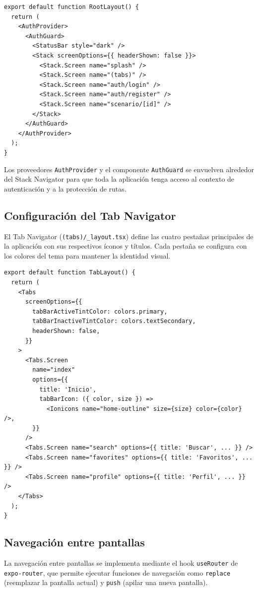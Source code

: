 \begin{lstlisting}
export default function RootLayout() {
  return (
    <AuthProvider>
      <AuthGuard>
        <StatusBar style="dark" />
        <Stack screenOptions={{ headerShown: false }}>
          <Stack.Screen name="splash" />
          <Stack.Screen name="(tabs)" />
          <Stack.Screen name="auth/login" />
          <Stack.Screen name="auth/register" />
          <Stack.Screen name="scenario/[id]" />
        </Stack>
      </AuthGuard>
    </AuthProvider>
  );
}
\end{lstlisting}

Los proveedores \texttt{AuthProvider} y el componente \texttt{AuthGuard}
se envuelven alrededor del Stack Navigator para que toda la aplicaci\'on tenga
acceso al contexto de autenticaci\'on y a la protecci\'on de rutas.

\subsection{Configuraci\'on del Tab Navigator}

El Tab Navigator (\texttt{(tabs)/\_layout.tsx}) define las cuatro
pesta\~nas principales de la aplicaci\'on con sus respectivos \'iconos y
t\'itulos. Cada pesta\~na se configura con los colores del tema para
mantener la identidad visual.

\begin{lstlisting}
export default function TabLayout() {
  return (
    <Tabs
      screenOptions={{
        tabBarActiveTintColor: colors.primary,
        tabBarInactiveTintColor: colors.textSecondary,
        headerShown: false,
      }}
    >
      <Tabs.Screen
        name="index"
        options={{
          title: 'Inicio',
          tabBarIcon: ({ color, size }) =>
            <Ionicons name="home-outline" size={size} color={color} />,
        }}
      />
      <Tabs.Screen name="search" options={{ title: 'Buscar', ... }} />
      <Tabs.Screen name="favorites" options={{ title: 'Favoritos', ... }} />
      <Tabs.Screen name="profile" options={{ title: 'Perfil', ... }} />
    </Tabs>
  );
}
\end{lstlisting}

\subsection{Navegaci\'on entre pantallas}

La navegaci\'on entre pantallas se implementa mediante el hook
\texttt{useRouter} de \texttt{expo-router}, que permite ejecutar funciones
de navegaci\'on como \texttt{replace} (reemplazar la pantalla actual) y
\texttt{push} (apilar una nueva pantalla).

